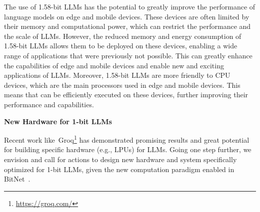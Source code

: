 The use of 1.58-bit LLMs has the potential to greatly improve the performance of language models on edge and mobile devices. These devices are often limited by their memory and computational power, which can restrict the performance and the scale of LLMs. However, the reduced memory and energy consumption of 1.58-bit LLMs allows them to be deployed on these devices, enabling a wide range of applications that were previously not possible. This can greatly enhance the capabilities of edge and mobile devices and enable new and exciting applications of LLMs. Moreover, 1.58-bit LLMs are more friendly to CPU devices, which are the main processors used in edge and mobile devices. This means that \our{} can be efficiently executed on these devices, further improving their performance and capabilities.

\textbf{New Hardware for 1-bit LLMs}

Recent work like~Groq\footnote{\url{https://groq.com/}} has demonstrated promising results and great potential for building specific hardware (e.g., LPUs) for LLMs. Going one step further, we envision and call for actions to design new hardware and system specifically optimized for 1-bit LLMs, given the new computation paradigm enabled in BitNet~\cite{bitnet}.



